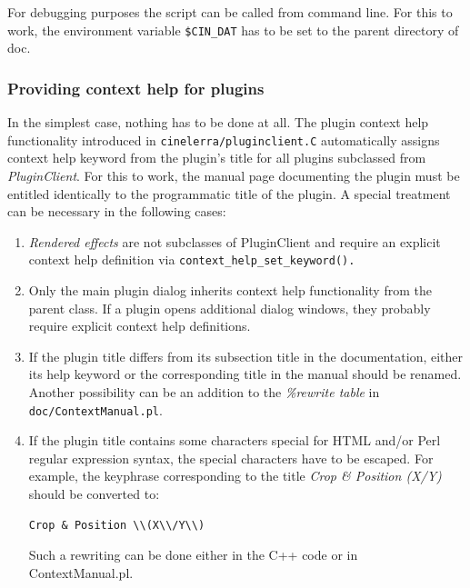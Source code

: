 For debugging purposes the script can be called from command line. For this to work, the environment variable \texttt{\$CIN\_DAT} has to be set to the parent directory of doc.


\subsubsection{Providing context help for plugins}%
\label{ssub:providing_context_help_plugins}

In the simplest case, nothing has to be done at all. The plugin context help functionality introduced in \texttt{cinelerra/pluginclient.C} automatically assigns context help keyword from the plugin's title for all plugins subclassed from \textit{PluginClient}. For this to work, the manual page documenting the plugin must be entitled identically to the programmatic title of the plugin. A special treatment can be necessary in the following cases:

\begin{enumerate}
        \item \textit{Rendered effects} are not subclasses of PluginClient and require an explicit context help definition via \texttt{context\_help\_set\_keyword().}
        \item Only the main plugin dialog inherits context help functionality from the parent class. If a plugin opens additional dialog windows, they probably require explicit context help definitions.
        \item If the plugin title differs from its subsection title in the documentation, either its help keyword or the corresponding title in the manual should be renamed. Another possibility can be an addition to the \textit{\%rewrite table} in \texttt{doc/ContextManual.pl}.
        \item If the plugin title contains some characters special for HTML and/or Perl regular expression syntax, the special characters have to be escaped. For example, the keyphrase corresponding to the title \textit{Crop \& Position (X/Y)} should be converted to:

        \begin{lstlisting}[style=sh]
                Crop & Position \\(X\\/Y\\)
        \end{lstlisting}

        Such a rewriting can be done either in the C++ code or in ContextManual.pl.
\end{enumerate}


